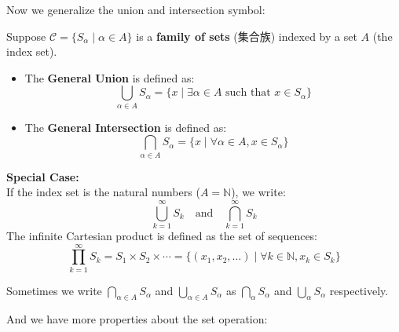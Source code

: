 \documentclass[
	UTF-8,
	11pt, %
	a4paper, %
]{LegrandOrangeBook}
\begin{document}
\newpage

	Now we generalize the union and intersection symbol:

\begin{definition}
Suppose $\mathcal{C} = \{ S_\alpha \mid \alpha \in A \}$ is a \textbf{family of sets} (集合族) indexed by a set $A$ (the index set).
\begin{itemize}
    \item The \textbf{General Union} is defined as:
    \[ \bigcup_{\alpha \in A} S_\alpha = \{ x \mid \exists \alpha \in A \text{ such that } x \in S_\alpha \} \]
    
    \item The \textbf{General Intersection} is defined as:
    \[ \bigcap_{\alpha \in A} S_\alpha = \{ x \mid \forall \alpha \in A, x \in S_\alpha \} \]
\end{itemize}

\vspace{0.5em}
\noindent \textbf{Special Case:} \\
If the index set is the natural numbers ($A = \mathbb{N}$), we write:
\[ \bigcup_{k=1}^{\infty} S_k \quad \text{and} \quad \bigcap_{k=1}^{\infty} S_k \]
The infinite Cartesian product is defined as the set of sequences:
\[ \prod_{k=1}^{\infty} S_k = S_1 \times S_2 \times \cdots = \{ (x_1, x_2, \dots) \mid \forall k \in \mathbb{N}, x_k \in S_k \} \]
\end{definition}

\begin{remark}
	Sometimes we write $\displaystyle\bigcap_{\alpha \in A} S_{\alpha}$ and $ \displaystyle\bigcup_{\alpha \in A} S_{\alpha} $ 
	as $\displaystyle\bigcap_{\alpha} S_{\alpha}$ 
	and $ \displaystyle\bigcup_{\alpha} S_{\alpha} $ respectively.

\end{remark}

And we have more properties about the set operation:
\end{document}
